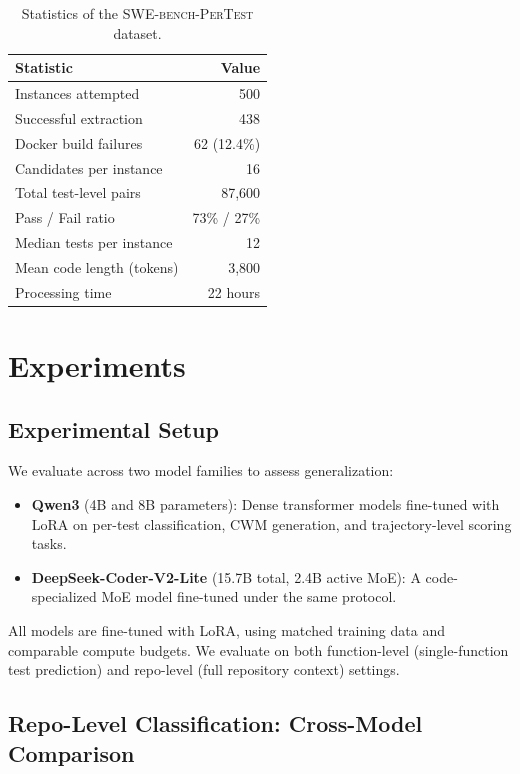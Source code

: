 \documentclass[11pt]{article}
\begin{document}
\begin{table}[t]
\centering
\caption{Statistics of the \textsc{SWE-bench-PerTest} dataset.}
\label{tab:dataset}
\begin{tabular}{lr}
\toprule
Statistic & Value \\
\midrule
Instances attempted & 500 \\
Successful extraction & 438 \\
Docker build failures & 62 (12.4\%) \\
Candidates per instance & 16 \\
Total test-level pairs & 87,600 \\
Pass / Fail ratio & 73\% / 27\% \\
Median tests per instance & 12 \\
Mean code length (tokens) & 3,800 \\
Processing time & 22 hours \\
\bottomrule
\end{tabular}
\end{table}

\section{Experiments}
\label{sec:experiments}

\subsection{Experimental Setup}

We evaluate across two model families to assess generalization:
\begin{itemize}
    \item \textbf{Qwen3} (4B and 8B parameters): Dense transformer models fine-tuned with LoRA on per-test classification, CWM generation, and trajectory-level scoring tasks.
    \item \textbf{DeepSeek-Coder-V2-Lite} (15.7B total, 2.4B active MoE): A code-specialized MoE model fine-tuned under the same protocol.
\end{itemize}
All models are fine-tuned with LoRA, using matched training data and comparable compute budgets. We evaluate on both function-level (single-function test prediction) and repo-level (full repository context) settings.

\subsection{Repo-Level Classification: Cross-Model Comparison}
\label{sec:repo-cls}
\end{document}
